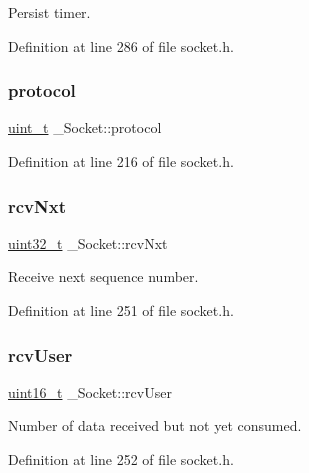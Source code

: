 Persist timer. 



Definition at line 286 of file socket.\+h.

\mbox{\label{struct__Socket_a28dccb8fd556a97be8d0d4344288744e}} 
\subsubsection{\texorpdfstring{protocol}{protocol}}
{\footnotesize\ttfamily \hyperlink{compiler__port_8h_a12a1e9b3ce141648783a82445d02b58d}{uint\+\_\+t} \+\_\+\+Socket\+::protocol}



Definition at line 216 of file socket.\+h.

\mbox{\label{struct__Socket_a35bacc9de52c79c6732d850b60e0b57a}} 
\subsubsection{\texorpdfstring{rcv\+Nxt}{rcvNxt}}
{\footnotesize\ttfamily \hyperlink{stdint_8h_a435d1572bf3f880d55459d9805097f62}{uint32\+\_\+t} \+\_\+\+Socket\+::rcv\+Nxt}



Receive next sequence number. 



Definition at line 251 of file socket.\+h.

\mbox{\label{struct__Socket_a6bea386a430525823ca87b6bcadc3726}} 
\subsubsection{\texorpdfstring{rcv\+User}{rcvUser}}
{\footnotesize\ttfamily \hyperlink{stdint_8h_a273cf69d639a59973b6019625df33e30}{uint16\+\_\+t} \+\_\+\+Socket\+::rcv\+User}



Number of data received but not yet consumed. 



Definition at line 252 of file socket.\+h.

